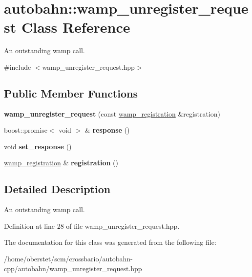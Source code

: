 \hypertarget{classautobahn_1_1wamp__unregister__request}{}\section{autobahn\+:\+:wamp\+\_\+unregister\+\_\+request Class Reference}
\label{classautobahn_1_1wamp__unregister__request}


An outstanding wamp call.  




{\ttfamily \#include $<$wamp\+\_\+unregister\+\_\+request.\+hpp$>$}

\subsection*{Public Member Functions}
\begin{DoxyCompactItemize}
\item 
{\bfseries wamp\+\_\+unregister\+\_\+request} (const \hyperlink{classautobahn_1_1wamp__registration}{wamp\+\_\+registration} \&registration)\hypertarget{classautobahn_1_1wamp__unregister__request_a428106faf3ac86f39579acca1343abe8}{}\label{classautobahn_1_1wamp__unregister__request_a428106faf3ac86f39579acca1343abe8}

\item 
boost\+::promise$<$ void $>$ \& {\bfseries response} ()\hypertarget{classautobahn_1_1wamp__unregister__request_aec77f37a846254834c5308f202e318e3}{}\label{classautobahn_1_1wamp__unregister__request_aec77f37a846254834c5308f202e318e3}

\item 
void {\bfseries set\+\_\+response} ()\hypertarget{classautobahn_1_1wamp__unregister__request_a0dde0b0c00f16796b070f91939f18d85}{}\label{classautobahn_1_1wamp__unregister__request_a0dde0b0c00f16796b070f91939f18d85}

\item 
\hyperlink{classautobahn_1_1wamp__registration}{wamp\+\_\+registration} \& {\bfseries registration} ()\hypertarget{classautobahn_1_1wamp__unregister__request_a359e24de936a52703e08ed1a9b708113}{}\label{classautobahn_1_1wamp__unregister__request_a359e24de936a52703e08ed1a9b708113}

\end{DoxyCompactItemize}


\subsection{Detailed Description}
An outstanding wamp call. 

Definition at line 28 of file wamp\+\_\+unregister\+\_\+request.\+hpp.



The documentation for this class was generated from the following file\+:\begin{DoxyCompactItemize}
\item 
/home/oberstet/scm/crossbario/autobahn-\/cpp/autobahn/wamp\+\_\+unregister\+\_\+request.\+hpp\end{DoxyCompactItemize}

